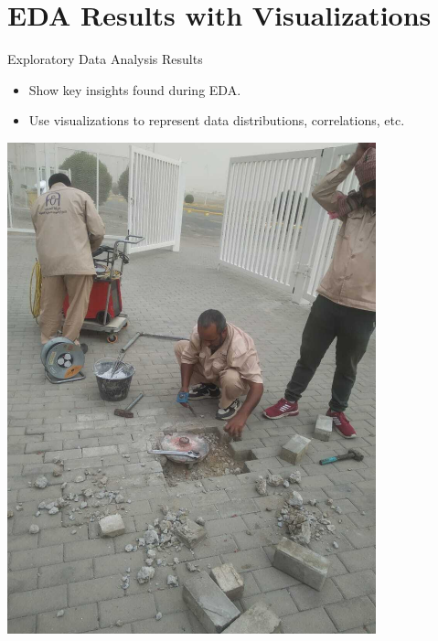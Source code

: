 \documentclass{beamer}
\begin{document}
\section{EDA Results with Visualizations}
\begin{frame}{Exploratory Data Analysis Results}
    \begin{itemize}
        \item Show key insights found during EDA.
        \item Use visualizations to represent data distributions, correlations, etc.
    \end{itemize}
    \includegraphics[width=0.8\textwidth]{images/eda_results.jpg}
\end{frame}

\end{document}

